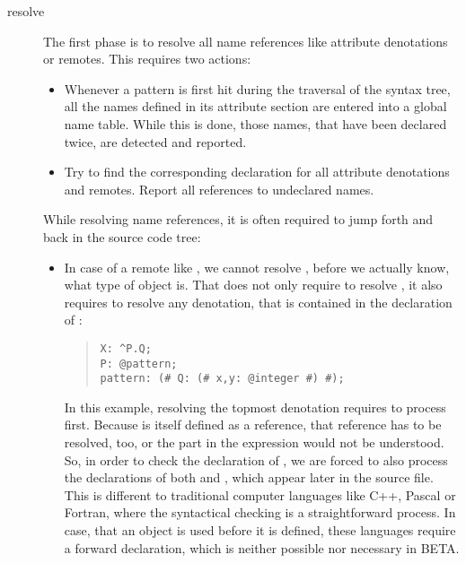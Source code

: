 \begin{description}
\item[resolve] The first phase is to resolve all name references
    like attribute denotations or remotes.  This requires two
    actions:
    \begin{itemize}
    \item Whenever a pattern is first hit during the traversal
	of the syntax tree, all the names defined in its
	attribute section are entered into a global name
	table.  While this is done, those names, that have
	been declared twice, are detected and reported.
    \item Try to find the corresponding declaration for all
	attribute denotations and remotes.  Report all
	references to undeclared names.
    \end{itemize}
    While resolving name references, it is often required to
    jump forth and back in the source code tree:
    \begin{itemize}
    \item In case of a remote like , we cannot resolve
	, before we actually know, what type of object
	 is.  That does not only require to resolve ,
	it also requires to resolve any denotation, that is
	contained in the declaration of :
	\begin{quote}\begin{verbatim}X: ^P.Q;
P: @pattern;
pattern: (# Q: (# x,y: @integer #) #);
\end{verbatim}\end{quote}
	In this example, resolving the topmost denotation
	 requires to process  first.  Because
	 is itself defined as a reference, that reference
	has to be resolved, too, or the part  in the
	expression  would not be understood.  So, in
	order to check the declaration of , we are forced
	to also process the declarations of both  and
	, which appear later in the source file.
	This is different to traditional computer languages like
	C++, Pascal or Fortran, where the syntactical checking is
	a straightforward process.  In case, that an object is
	used before it is defined, these languages require a
	forward declaration, which is neither possible nor
	necessary in BETA.


\end{itemize}
\end{description}
